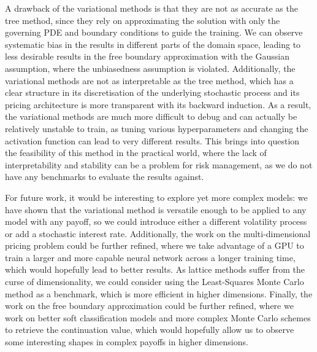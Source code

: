 A drawback of the variational methods is that they are not as accurate as the tree method, since they rely on approximating the solution with only the governing PDE and boundary conditions to guide the training. We can observe systematic bias in the results in different parts of the domain space, leading to less desirable results in the free boundary approximation with the Gaussian assumption, where the unbiasedness assumption is violated. Additionally, the variational methods are not as interpretable as the tree method, which has a clear structure in its discretisation of the underlying stochastic process and its pricing architecture is more transparent with its backward induction. As a result, the variational methods are much more difficult to debug and can actually be relatively unstable to train, as tuning various hyperparameters and changing the activation function can lead to very different results. This brings into question the feasibility of this method in the practical world, where the lack of interpretability and stability can be a problem for risk management, as we do not have any benchmarks to evaluate the results against.

For future work, it would be interesting to explore yet more complex models: we have shown that the variational method is versatile enough to be applied to any model with any payoff, so we could introduce either a different volatility process or add a stochastic interest rate. Additionally, the work on the multi-dimensional pricing problem could be further refined, where we take advantage of a GPU to train a larger and more capable neural network across a longer training time, which would hopefully lead to better results. As lattice methods suffer from the curse of dimensionality, we could consider using the Least-Squares Monte Carlo method as a benchmark, which is more efficient in higher dimensions. Finally, the work on the free boundary approximation could be further refined, where we work on better soft classification models and more complex Monte Carlo schemes to retrieve the continuation value, which would hopefully allow us to observe some interesting shapes in complex payoffs in higher dimensions.
